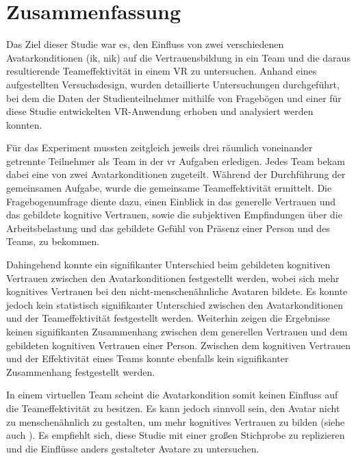 \documentclass[a4paper,11pt]{article}%
\renewcommand{\\}{\vspace*{0.5\baselineskip} \newline}
\begin{document}
\section{Zusammenfassung}
Das Ziel dieser Studie war es, den Einfluss von zwei verschiedenen Avatarkonditionen (\ac{ik}, \ac{nik}) auf die Vertrauensbildung in ein Team und die daraus resultierende Teameffektivität in einem VR zu untersuchen. 
Anhand eines aufgestellten Versuchsdesign, wurden detaillierte Untersuchungen durchgeführt, bei dem die Daten der Studienteilnehmer mithilfe von Fragebögen und einer für diese Studie entwickelten VR-Anwendung erhoben und analysiert werden konnten.

Für das Experiment mussten zeitgleich jeweils drei räumlich voneinander getrennte Teilnehmer als Team in der \ac{vr} Aufgaben erledigen. Jedes Team bekam dabei eine von zwei Avatarkonditionen zugeteilt. Während der Durchführung der gemeinsamen Aufgabe, wurde die gemeinsame Teameffektivität ermittelt. Die Fragebogenumfrage diente dazu, einen Einblick in das generelle Vertrauen und das gebildete kognitive Vertrauen, sowie die subjektiven Empfindungen über die Arbeitsbelastung und das gebildete Gefühl von Präsenz einer Person und des Teams, zu bekommen.

Dahingehend konnte ein signifikanter Unterschied beim gebildeten kognitiven Vertrauen zwischen den Avatarkonditionen festgestellt werden, wobei sich mehr kognitives Vertrauen bei den nicht-menschenähnliche Avataren bildete. Es konnte jedoch kein statistisch signifikanter Unterschied zwischen den Avatarkonditionen und der Teameffektivität festgestellt werden. Weiterhin zeigen die Ergebnisse keinen signifikanten Zusammenhang zwischen dem generellen Vertrauen und dem gebildeten kognitiven Vertrauen einer Person. Zwischen dem kognitiven Vertrauen und der Effektivität eines Teams konnte ebenfalls kein signifikanter Zusammenhang festgestellt werden.

In einem virtuellen Team scheint die Avatarkondition somit keinen Einfluss auf die Teameffektivität zu besitzen. Es kann jedoch sinnvoll sein, den Avatar nicht zu menschenähnlich zu gestalten, um mehr kognitives Vertrauen zu bilden (siehe auch \textit{}). Es empfiehlt sich, diese Studie mit einer großen Stichprobe zu replizieren und die Einflüsse anders gestalteter Avatare zu untersuchen.

%
%
\newpage
\end{document}
